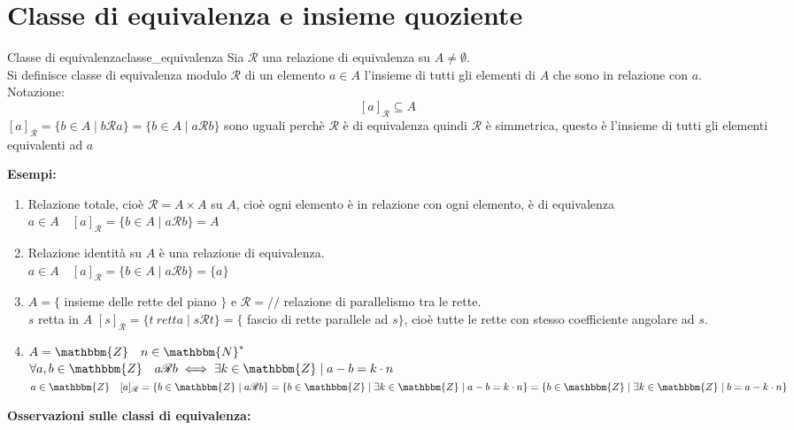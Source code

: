 \documentclass[12pt, letterpaper]{report}
\newcounter{definition}
\newcommand{\nmu}{}
\begin{document}
		\section{Classe di equivalenza e insieme quoziente}
		\begin{definition}{\nmu Classe di equivalenza}{classe_equivalenza}
			Sia $\mathscr{R}$ una relazione di equivalenza su $A \neq \emptyset$. \\
			Si definisce classe di equivalenza modulo $\mathscr{R}$ di un elemento $a \in A$ l'insieme di tutti gli elementi di $A$ che sono in relazione con $a$. \\
			Notazione:
			\[
			[a]_\mathscr{R} \subseteq A
			\]
			$[a]_\mathscr{R} = \{b \in A \mid b \mathscr{R} a\} = \{b \in A \mid a \mathscr{R} b\}$ sono uguali perchè $\mathscr{R}$ è di equivalenza quindi $\mathscr{R}$ è simmetrica, questo è l'insieme di tutti gli elementi equivalenti ad $a$
		\end{definition}
		\textbf{Esempi:}
		\begin{enumerate}
			\item Relazione totale, cioè $\mathscr{R} = A \times A$ su $A$, cioè ogni elemento è in relazione con ogni elemento, è di equivalenza \\
			$a \in A \quad [a]_\mathscr{R} = \{b \in A \mid a \mathscr{R} b\} = A$
			\item Relazione identità su $A$ è una relazione di equivalenza. \\
			$a \in A \quad [a]_\mathscr{R} = \{b \in A \mid a \mathscr{R} b\} = \{a\}$
			\item $A = \{$ insieme delle rette del piano $\}$ e $\mathscr{R} = //$ relazione di parallelismo tra le rette. \\
			$s$ retta in $A$ $[s]_\mathscr{R} = \{t\ retta \mid s \mathscr{R} t\} = \{$ fascio di rette parallele ad $s\}$, cioè tutte le rette con stesso coefficiente angolare ad $s$.
			\item $A = \mathbbm{Z} \quad n \in \mathbbm{N}^*$ \\
			$\forall a, b \in \mathbbm{Z} \quad a \mathscr{R} b \iff \exists k \in \mathbbm{Z} \mid a - b = k \cdot n$ \\
			$a \in \mathbbm{Z} \quad [a]_\mathscr{R} = \{b \in \mathbbm{Z} \mid a \mathscr{R} b\} = \{b \in \mathbbm{Z} \mid \exists k  \in \mathbbm{Z} \mid a - b = k \cdot n\} = \{b \in \mathbbm{Z} \mid \exists k \in \mathbbm{Z} \mid b = a - k \cdot n\}$
		\end{enumerate}
		\textbf{Osservazioni sulle classi di equivalenza:}
\end{document}
